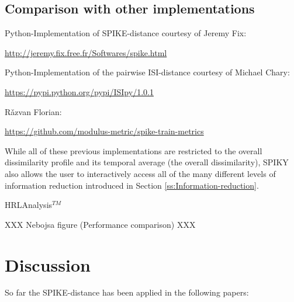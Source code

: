 \documentclass[10pt,twocolumn]{elsart5p}
\begin{document}
\subsection{\label{ss:Comparison} Comparison with other implementations}

Python-Implementation of SPIKE-distance courtesy of Jeremy Fix:

\url{http://jeremy.fix.free.fr/Softwares/spike.html}

Python-Implementation of the pairwise ISI-distance courtesy of Michael Chary:

\url{https://pypi.python.org/pypi/ISIpy/1.0.1}

R{\v a}zvan Florian:

\url{https://github.com/modulus-metric/spike-train-metrics}

\citep{Rusu14}

While all of these previous implementations are restricted to the overall dissimilarity profile and its temporal average (the overall dissimilarity), SPIKY also allows the user to interactively access all of the many different levels of information reduction introduced in Section \ref{ss:Information-reduction}.




HRLAnalysis$^{TM}$ \citep{Thibeault14}

XXX Nebojsa figure (Performance comparison) XXX
%

%
%
%
%
\section{\label{s:Discussion} Discussion}

So far the SPIKE-distance has been applied in the following papers:

\citep{Papoutsi13, DiPoppa13, Rusu14, Sacre14}
\end{document}
